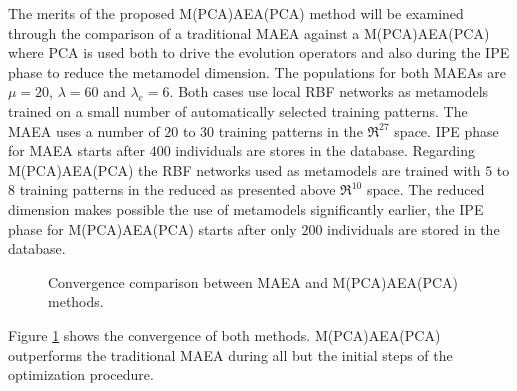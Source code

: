 The merits of the proposed M(PCA)AEA(PCA) method will be examined through the comparison of a traditional MAEA against a M(PCA)AEA(PCA) where PCA is used both to drive the evolution operators and also during the IPE phase to reduce the metamodel dimension. The populations for both MAEAs are $\mu=20$, $\lambda=60$ and $\lambda_e=6$. Both cases use local RBF networks as metamodels trained on a small number of automatically selected training patterns. The MAEA uses a number of  $20$ to $30$ training patterns in the $\Re^{27}$ space. IPE phase for MAEA starts after $400$ individuals are stores in the database. Regarding M(PCA)AEA(PCA) the RBF networks used as metamodels are trained with $5$ to $8$ training patterns in the reduced as presented above $\Re^{10}$ space. The reduced dimension makes possible the use of metamodels significantly earlier, the IPE phase for M(PCA)AEA(PCA) starts after only $200$ individuals are stored in the database. 


\begin{figure}[h!]
\begin{minipage}[b]{1\linewidth}
 \centering
\end{minipage}
\caption{Convergence comparison between MAEA and M(PCA)AEA(PCA) methods.} 
\label{PCADrelaRes}
\end{figure}

Figure \ref{PCADrelaRes} shows the convergence of both methods. M(PCA)AEA(PCA) outperforms the traditional MAEA during all but the initial steps of the optimization procedure. 

